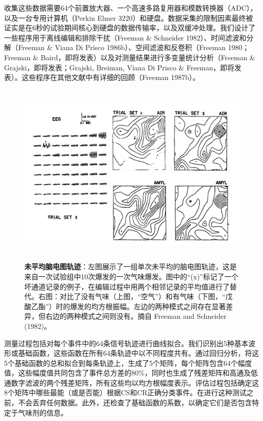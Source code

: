 \documentclass[a4paper,12pt]{article}
\newcommand{\longcaption}[2]{\caption[#1]{\textbf{#1}：#2}}
\begin{document}
收集这些数据需要64个前置放大器、一个高速多路复用器和模数转换器（ADC），以及一台专用计算机（Perkin Elmer 3220）和硬盘。数据采集的限制因素最终被证实是在6秒的试验期间核心到硬盘的数据传输率，以及双缓冲处理。我们设计了一些程序用于离线编辑和排除干扰（Freeman \& Schneider 1982）、时间滤波和分解（Freeman \& Viana Di Prisco 1986b）、空间滤波和反卷积（Freeman 1980；Freeman \& Baird，即将发表）以及对测量结果进行多变量统计分析（Freeman \& Grajski，即将发表；Grajski, Breiman, Viana Di Prisco \& Freeman，即将发表）。这些程序在其他文献中有详细的回顾（Freeman 1987b）。

\begin{figure}[ht]
    \centering
    \includegraphics[height=3.5in]{images/fig3.jpg}
    \longcaption{未平均脑电图轨迹}{左图展示了一组单次未平均的脑电图轨迹，这是来自一次试验组中10次爆发的一次气味爆发。图中的“(x)”标记了一个坏通道记录的例子，在编辑过程中用两个相邻记录的平均值进行了替代。右图：对比了没有气味（上图，“空气”）和有气味（下图，“戊酸乙酯”）时的爆发的均方根振幅。左边的两种模式之间存在显著差异，但右边的两种模式之间则没有。摘自 Freeman and Schneider (1982)。}
\end{figure}

测量过程包括对每个事件中的64条信号轨迹进行曲线拟合。我们识别出5种基本波形或基础函数，这些函数在所有64条轨迹中以不同程度共有。通过回归分析，将这5个基础函数的总和拟合到每条轨迹上，生成了5个矩阵，每个矩阵包含64个幅度值，这些幅度值共同包含了事件总方差的80\%，同时也生成了残差矩阵和高通及低通数字滤波的两个残差矩阵，所有这些均以均方根幅度表示。评估过程包括确定这8个矩阵中哪些最能（或是否能）根据CS和CR正确分类事件。在进行这种测试之前，不会丢弃任何数据。此外，还检查了基础函数的系数，以确定它们是否包含特定于气味剂的信息。
\end{document}
